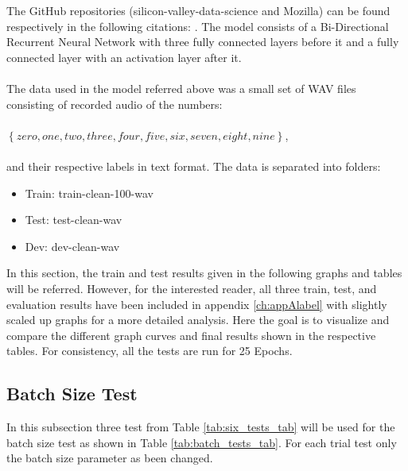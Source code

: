 The GitHub repositories (silicon-valley-data-science and Mozilla)
can be found respectively in the following citations:
\cite{rubashkin2017, mozilla2017}.
The model consists of a Bi-Directional Recurrent Neural Network
with three fully connected layers before it and a fully connected
layer with an activation layer after it.\\\\
The data used in the model referred above was a small set of WAV files consisting of recorded audio of the numbers:\\\\
$\left\{zero, one, two, three, four, five, six, seven, eight, nine \right\}$,\\\\
and their respective labels in text format. The data is separated into folders:
\begin{itemize}
    \item Train: train-clean-100-wav
    \item Test: test-clean-wav
    \item Dev: dev-clean-wav
\end{itemize}
In this section, the train and test results given in the following graphs and tables will be referred. However, for the interested
reader, all three train, test, and evaluation
results have been included in appendix \ref{ch:appAlabel} with slightly scaled up graphs for a more detailed analysis.
Here the goal is to visualize and compare the different graph curves and final results shown in the respective tables.
For consistency, all the tests are run for 25 Epochs. 

\subsection{Batch Size Test}
In this subsection three test from Table \ref{tab:six_tests_tab}  
will be used for the batch size test as shown in Table \ref{tab:batch_tests_tab}. For each trial test only the batch size parameter as been changed.

